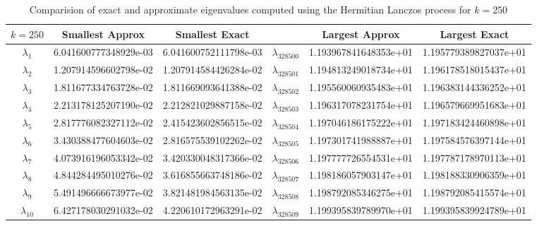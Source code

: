 \documentclass[12pt]{article}
\begin{document}
\begin{itemize}
\begin{table}[H]
\renewcommand{\arraystretch}{1.5}
\begin{small}
\hspace{-.9in}
\begin{tabular}{| c | c | c || c | c | c |}
\hline
$k = 250$ &  \textbf{Smallest Approx} & \textbf{Smallest Exact} &   & \textbf{Largest Approx} & \textbf{Largest Exact}\\
\hline 
\hline
$\lambda_1$  &  6.041600777348929e-03  & 6.041600752111798e-03  & $\lambda_{328500}$  & 1.193967841648353e+01  &  1.195779389827037e+01 \\
$\lambda_2$  & 1.207914596602798e-02  &  1.207914584426284e-02 & $\lambda_{328501}$  & 1.194813249018734e+01  &  1.196178518015437e+01 \\
$\lambda_3$  & 1.811677334763728e-02  &  1.811669093641388e-02 & $\lambda_{328502}$  & 1.195560060935483e+01  &  1.196383144336252e+01 \\
$\lambda_4$  & 2.213178125207190e-02  & 2.212821029887158e-02  & $\lambda_{328503}$  & 1.196317078231754e+01  &  1.196579669951683e+01 \\
$\lambda_5$  & 2.817776082327112e-02  & 2.415423602856515e-02  & $\lambda_{328504}$  & 1.197046186175222e+01  &  1.197183424460898e+01 \\
$\lambda_6$  & 3.430388477604603e-02  & 2.816575539102262e-02  & $\lambda_{328505}$  & 1.197301741988887e+01  &  1.197584576397144e+01 \\
$\lambda_7$  & 4.073916196053342e-02  & 3.420330048317366e-02  & $\lambda_{328506}$  & 1.197777726554531e+01  &  1.197787178970113e+01 \\
$\lambda_8$  & 4.844284495010276e-02  & 3.616855663748186e-02  & $\lambda_{328507}$  & 1.198186057903147e+01  &  1.198188330906359e+01 \\
$\lambda_9$  &  5.491496666673977e-02 & 3.821481984563135e-02  & $\lambda_{328508}$  & 1.198792085346275e+01  &  1.198792085415574e+01 \\
$\lambda_{10}$  & 6.427178030291032e-02  & 4.220610172963291e-02  & $\lambda_{328509}$  & 1.199395839789970e+01  &  1.199395839924789e+01 \\
\hline
\end{tabular}
\end{small}
\caption{Comparision of exact and approximate eigenvalues computed using the Hermitian Lanczos process for $k = 250$}
\end{table} 


\end{itemize}
\end{document}
